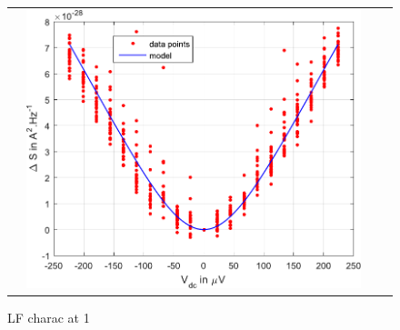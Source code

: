 \begin{figure}[hptb]
\begin{center}
\begin{tabular}{c c c c}
			& \includegraphics[width = 6.5 cm]{./appE/nu_1_noise_vs_Vdc_for_D_0_4_0_8}
			
		\end{tabular}
	\end{center}
	
	\caption{LF charac at 1}
	\label{fig: LF charac at 1}
\end{figure}
